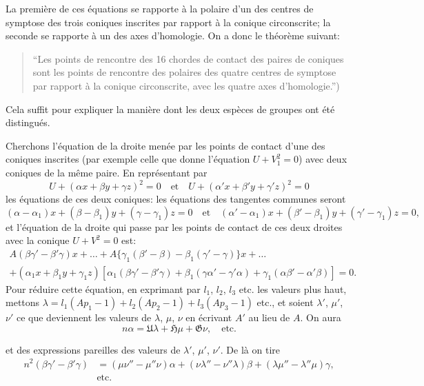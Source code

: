 \documentclass[11pt,a4paper]{book}
\begin{document}
La premi\`{e}re de ces \'{e}quations se rapporte \`{a} la polaire d'un des centres de symptose des trois coniques inscrites par rapport \`{a} la conique circonscrite; la seconde se rapporte \`{a} un des axes d'homologie. On a donc le th\'{e}or\`{e}me suivant:

\begin{quote}
``Les points de rencontre des 16 chordes de contact des paires de coniques sont les points de rencontre des polaires des quatre centres de symptose par rapport \`{a} la conique circonscrite, avec les quatre axes d'homologie.'')
\end{quote}

Cela suffit pour expliquer la mani\`{e}re dont les deux esp\`{e}ces de groupes ont \'{e}t\'{e} distingu\'{e}s.

Cherchons l'\'{e}quation de la droite men\'{e}e par les points de contact d'une des coniques inscrites (par exemple celle que donne l'\'{e}quation $U + V_1^2 = 0$) avec deux coniques de la m\^{e}me paire. En repr\'{e}sentant par
\[
U + (\alpha x + \beta y + \gamma z)^2 = 0 \quad \text{et} \quad U + (\alpha' x + \beta' y + \gamma' z)^2 = 0
\]
les \'{e}quations de ces deux coniques: les \'{e}quations des tangentes communes seront
\[
(\alpha - \alpha_1)x + (\beta - \beta_1)y + (\gamma - \gamma_1)z = 0 \quad \text{et} \quad (\alpha' - \alpha_1)x + (\beta' - \beta_1)y + (\gamma' - \gamma_1)z = 0,
\]
et l'\'{e}quation de la droite qui passe par les points de contact de ces deux droites avec la conique $U + V^2 = 0$ est:
\begin{multline*}
A(\beta\gamma' - \beta'\gamma)x + \ldots + A\{\gamma_1(\beta' - \beta) - \beta_1(\gamma' - \gamma)\}x + \ldots \\
+ (\alpha_1 x + \beta_1 y + \gamma_1 z)[\alpha_1(\beta\gamma' - \beta'\gamma) + \beta_1(\gamma\alpha' - \gamma'\alpha) + \gamma_1(\alpha\beta' - \alpha'\beta)] = 0.
\end{multline*}
Pour r\'{e}duire cette \'{e}quation, en exprimant par $l_1$, $l_2$, $l_3$ etc. les valeurs plus haut, mettons $\lambda = l_1(Ap_1 - 1) + l_2(Ap_2 - 1) + l_3(Ap_3 - 1)$ etc., et soient $\lambda'$, $\mu'$, $\nu'$ ce que deviennent les valeurs de $\lambda$, $\mu$, $\nu$ en \'{e}crivant $A'$ au lieu de $A$. On aura
\[
n\alpha = \mathfrak{U}\lambda + \mathfrak{H}\mu + \mathfrak{G}\nu, \quad \text{etc.}
\]

et des expressions pareilles des valeurs de $\lambda'$, $\mu'$, $\nu'$. De l\`{a} on tire
\begin{align*}
n^2(\beta\gamma' - \beta'\gamma) &= (\mu\nu'' - \mu''\nu)\alpha + (\nu\lambda'' - \nu''\lambda)\beta + (\lambda\mu'' - \lambda''\mu)\gamma, \\
&\text{etc.}
\end{align*}
\end{document}
